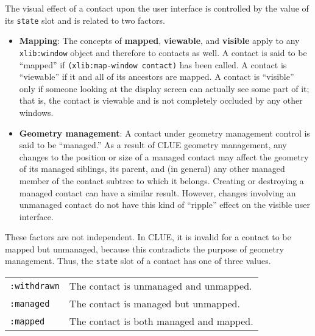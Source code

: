 The visual effect of a contact upon the user interface is controlled by the
value of its {\tt state} slot and is related to two
factors\footnotemark{}.
\begin{itemize}

\item {\bf Mapping}:
The concepts of {\bf mapped}, {\bf viewable}, and
{\bf visible} apply to any {\tt xlib:window} object and therefore
to contacts as well\cite{x-protocol}.
A contact is said to be ``mapped'' if {\tt (xlib:map-window
contact)} has been called. A contact is ``viewable'' if it and all of its
ancestors are mapped. A contact is ``visible'' only if someone looking at the
display screen can actually see some part of it; that is, the contact is
viewable and is not completely occluded by any other windows.

\item {\bf Geometry management}: A contact under geometry management control is
said to be ``managed.'' As a
result of CLUE geometry management, any changes to the position or size of a
managed contact may affect the geometry of its managed siblings, its parent, and
(in general) any other managed member of the contact subtree to which it
belongs.  Creating or destroying a managed contact can have a similar
result. However, changes involving an unmanaged contact
do not have this kind of ``ripple'' effect on the visible user interface. 
\end{itemize}

These factors are not independent. In CLUE, it is invalid for a contact
to be mapped but unmanaged, because this contradicts the purpose of geometry
management\footnotemark{}. Thus, the {\tt state} slot of a
contact has one of three values.

\begin{center}
\begin{tabular}{ll}
{\tt :withdrawn} & The contact is unmanaged and unmapped.\\
 {\tt :managed} & The contact is managed but unmapped.\\
 {\tt :mapped} & The contact is both  managed and mapped.
\end{tabular}
\end{center}


